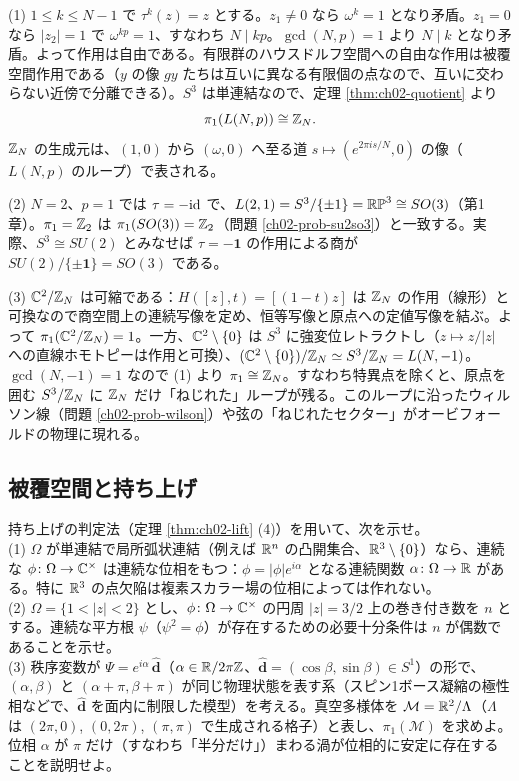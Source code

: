 \begin{solution}
(1) $1\le k\le N-1$ で $\tau^k(z)=z$ とする。$z_1\ne0$ なら $\omega^k=1$ となり矛盾。$z_1=0$ なら $\lvert z_2\rvert=1$ で $\omega^{kp}=1$、すなわち $N\mid kp$。$\gcd(N,p)=1$ より $N\mid k$ となり矛盾。よって作用は自由である。有限群のハウスドルフ空間への自由な作用は被覆空間作用である（$y$ の像 $gy$ たちは互いに異なる有限個の点なので、互いに交わらない近傍で分離できる）。$S^3$ は単連結なので、定理 \ref{thm:ch02-quotient} より
\[
\pi_1(L(N,p))\cong\mathbb{Z}_N .
\]
$\mathbb{Z}_N$ の生成元は、$(1,0)$ から $(\omega,0)$ へ至る道 $s\mapsto(e^{2\pi is/N},0)$ の像（$L(N,p)$ のループ）で表される。

(2) $N=2$、$p=1$ では $\tau=-\mathrm{id}$ で、$L(2,1)=S^3/\{\pm1\}=\mathbb{RP}^3\cong SO(3)$（第1章）。$\pi_1=\mathbb{Z}_2$ は $\pi_1(SO(3))=\mathbb{Z}_2$（問題 \ref{ch02-prob-su2so3}）と一致する。実際、$S^3\cong SU(2)$ とみなせば $\tau=-\mathbf 1$ の作用による商が $SU(2)/\{\pm\mathbf 1\}=SO(3)$ である。

(3) $\mathbb{C}^2/\mathbb{Z}_N$ は可縮である：$H([z],t)=[(1-t)z]$ は $\mathbb{Z}_N$ の作用（線形）と可換なので商空間上の連続写像を定め、恒等写像と原点への定値写像を結ぶ。よって $\pi_1(\mathbb{C}^2/\mathbb{Z}_N)=1$。一方、$\mathbb{C}^2\setminus\{0\}$ は $S^3$ に強変位レトラクトし（$z\mapsto z/\lvert z\rvert$ への直線ホモトピーは作用と可換）、$(\mathbb{C}^2\setminus\{0\})/\mathbb{Z}_N\simeq S^3/\mathbb{Z}_N=L(N,-1)$。$\gcd(N,-1)=1$ なので (1) より $\pi_1\cong\mathbb{Z}_N$。すなわち特異点を除くと、原点を囲む $S^3/\mathbb{Z}_N$ に $\mathbb{Z}_N$ だけ「ねじれた」ループが残る。このループに沿ったウィルソン線（問題 \ref{ch02-prob-wilson}）や弦の「ねじれたセクター」がオービフォールドの物理に現れる。
\end{solution}

\subsection{被覆空間と持ち上げ}

\begin{problem}[難易度 C]\label{ch02-prob-sqrt}
持ち上げの判定法（定理 \ref{thm:ch02-lift} (4)）を用いて、次を示せ。\\
(1) $\Omega$ が単連結で局所弧状連結（例えば $\mathbb{R}^n$ の凸開集合、$\mathbb{R}^3\setminus\{0\}$）なら、連続な $\phi\colon\Omega\to\mathbb{C}^\times$ は連続な位相をもつ：$\phi=\lvert\phi\rvert e^{i\alpha}$ となる連続関数 $\alpha\colon\Omega\to\mathbb{R}$ がある。特に $\mathbb{R}^3$ の点欠陥は複素スカラー場の位相によっては作れない。\\
(2) $\Omega=\{1<\lvert z\rvert<2\}$ とし、$\phi\colon\Omega\to\mathbb{C}^\times$ の円周 $\lvert z\rvert=3/2$ 上の巻き付き数を $n$ とする。連続な平方根 $\psi$（$\psi^2=\phi$）が存在するための必要十分条件は $n$ が偶数であることを示せ。\\
(3) 秩序変数が $\Psi=e^{i\alpha}\,\hat{\bm d}$（$\alpha\in\mathbb{R}/2\pi\mathbb{Z}$、$\hat{\bm d}=(\cos\beta,\sin\beta)\in S^1$）の形で、$(\alpha,\beta)$ と $(\alpha+\pi,\beta+\pi)$ が同じ物理状態を表す系（スピン1ボース凝縮の極性相などで、$\hat{\bm d}$ を面内に制限した模型）を考える。真空多様体を $\mathcal M=\mathbb{R}^2/\Lambda$（$\Lambda$ は $(2\pi,0)$, $(0,2\pi)$, $(\pi,\pi)$ で生成される格子）と表し、$\pi_1(\mathcal M)$ を求めよ。位相 $\alpha$ が $\pi$ だけ（すなわち「半分だけ」）まわる渦が位相的に安定に存在することを説明せよ。
\end{problem}

